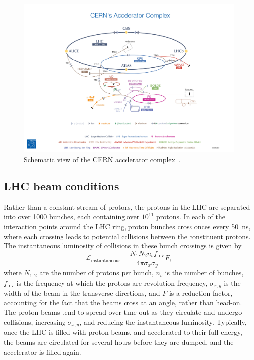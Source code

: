 \begin{figure}[ht]
  \centering
  \includegraphics[width=\textwidth, clip=true, trim=15cm 0 15cm 10cm]
    {figs/lhc/accelerator_complex.jpg}
  \caption{
    Schematic view of the CERN accelerator complex~\cite{Marcastel:1621583}.
  }
  \label{fig:cern_complex}
\end{figure}

\FloatBarrier
\subsection{LHC beam conditions}
\label{sec:beam_conditions}

Rather than a constant stream of protons, the protons in the LHC are separated
into over 1000 bunches, each containing over $10^{11}$ protons.
In each of the interaction points around the LHC ring, proton bunches cross
onces every 50~ns, where each crossing leads to potential collisions between
the constituent protons.
The instantaneous luminosity of collisions in these bunch crossings is given by
\begin{equation}
  \mathcal{L}_\mathrm{instantaneous} =
  \frac{N_{1}N_{2} n_b f_\mathrm{rev}}
  {4\pi \sigma_{x} \sigma_{y}}
  F,
\end{equation}
where $N_{1,2}$ are the number of protons per bunch, $n_b$ is the number of
bunches, $f_\mathrm{rev}$ is the frequency at which the protons are revolution
frequency, $\sigma_{x,y}$ is the width of the beam in the transverse directions,
and $F$ is a reduction factor, accounting for the fact that the beams cross
at an angle, rather than head-on.
The proton beams tend to spread over time out as they circulate and undergo
collisions, increasing $\sigma_{x,y}$, and reducing the instantaneous
luminosity.
Typically, once the LHC is filled with proton beams, and accelerated to their
full energy, the beams are circulated for several hours before they are dumped,
and the accelerator is filled again.

